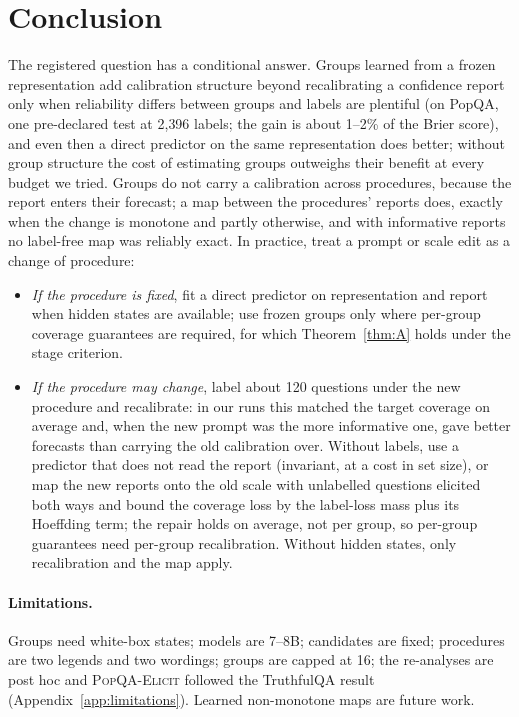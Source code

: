 \documentclass[11pt]{article}
\theoremstyle{definition}
\theoremstyle{remark}
\newcommand{\1}{\mathbf{1}}
\newcommand{\expname}[1]{\textsc{#1}}
\begin{document}
\section{Conclusion}
\label{sec:conclusion}
The registered question has a conditional answer. Groups learned from a frozen representation add
calibration structure beyond recalibrating a confidence report only when reliability differs between
groups and labels are plentiful (on PopQA, one pre-declared test at 2{,}396 labels; the gain is about
1--2\% of the Brier score), and even then a direct predictor on the same representation does better;
without group structure the cost of estimating groups outweighs their benefit at every budget we
tried. Groups do not carry a calibration across procedures, because the report enters their
forecast; a map between the procedures' reports does, exactly when the change is monotone and
partly otherwise, and with informative reports no label-free map was reliably exact. In practice, treat a prompt or scale edit as a change of procedure:
\begin{itemize}
  \item \emph{If the procedure is fixed}, fit a direct predictor on representation and report when hidden
  states are available; use frozen groups only where per-group coverage guarantees are required, for
  which Theorem~\ref{thm:A} holds under the stage criterion.
  \item \emph{If the procedure may change}, label about 120 questions under the new procedure and
  recalibrate: in our runs this matched the target coverage on average and, when the new prompt was the
  more informative one, gave better forecasts than carrying the old calibration over. Without labels, use
  a predictor that does not read the report (invariant, at a cost in set size), or map the new reports
  onto the old scale with unlabelled questions elicited both ways and bound the coverage loss by the
  label-loss mass plus its Hoeffding term; the repair holds on average, not per group, so per-group
  guarantees need per-group recalibration. Without hidden states, only recalibration and the map apply.
\end{itemize}

\paragraph{Limitations.} Groups need white-box states; models are 7--8B; candidates are fixed; procedures are
two legends and two wordings; groups are capped at 16; the re-analyses are post hoc and \expname{PopQA-Elicit}
followed the TruthfulQA result (Appendix~\ref{app:limitations}). Learned non-monotone maps are future work.
\end{document}
